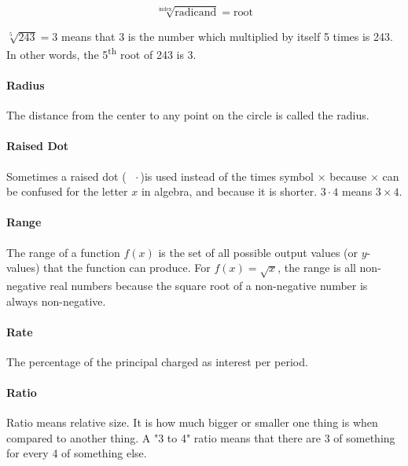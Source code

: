 \documentclass[12pt]{article}
\begin{document}
{$$\sqrt[\textrm{index}]{\textrm{radicand}}=\textrm{root}$$

$\sqrt[5]{243} = 3$ means that 3 is the number which multiplied by itself 5 times is 243. In other words, the 5\textsuperscript{th} root of 243 is 3.

\paragraph{Radius}
The distance from the center to any point on the circle is called the radius.

\begin{center}
\end{center}

\paragraph{Raised Dot}
Sometimes a raised dot ($\text{ }\cdot$\text{ })is used instead of the times symbol $\times$ because $\times$ can be confused for the letter $x$ in algebra, and because it is shorter. $3 \cdot 4$ means $3 \times 4$.

\paragraph{Range}
The range of a function \( f(x) \) is the set of all possible output values (or \( y \)-values) that the function can produce. For \( f(x) = \sqrt{x} \), the range is all non-negative real numbers because the square root of a non-negative number is always non-negative.

\paragraph{Rate}
The percentage of the principal charged as interest per period.

\paragraph{Ratio}
Ratio means relative size. It is how much bigger or smaller one thing is when compared to another thing. A "3 to 4" ratio means that there are 3 of something for every 4 of something else.

}
\end{document}
